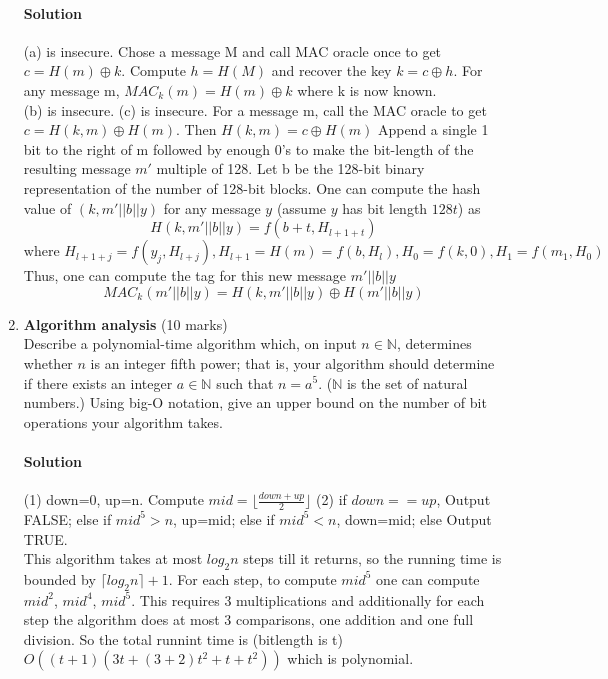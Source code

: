\documentclass[11pt]{article}
\newcommand{\NN}{{\mathbb N}}
\newcommand{\floor}[1]{\lfloor #1 \rfloor}
\begin{document}
\begin{enumerate}
\paragraph{Solution}
(a) is insecure. Chose a message M and call MAC oracle once to get $c=H(m)\oplus k$. Compute $h=H(M)$ and recover the key $k=c\oplus h$. For any message m, $MAC_k(m)=H(m)\oplus k$ where k is now known.\\
(b) is insecure.
(c) is insecure. For a message m, call the MAC oracle to get $c=H(k,m)\oplus H(m)$. Then $H(k,m)=c\oplus H(m)$ Append a single 1 bit to the right of m followed by enough 0's to make the bit-length of the resulting message $m'$ multiple of 128. Let b be the 128-bit binary representation of the number of 128-bit blocks.
One can compute the hash value of $(k,m'||b||y)$ for any message $y$ (assume $y$ has bit length $128t$) as
\[
H(k,m'||b||y)=f(b+t,H_{l+1+t})\] \[ \text{where }H_{l+1+j}=f(y_j,H_{l+j}),
H_{l+1}=H(m)=f(b,H_l), H_0=f(k,0), H_1=f(m_1,H_0)
\]
Thus, one can compute the tag for this new message $m'||b||y$
\[
MAC_k(m'||b||y)=H(k,m'||b||y)\oplus H(m'||b||y)
\]

\newpage
\item {\bf Algorithm analysis} (10 marks) \\
Describe a polynomial-time algorithm which, on input $n \in \NN$,
determines whether $n$ is an integer fifth power; that is, your algorithm
should determine if there exists an integer $a \in \NN$ such that $n
= a^5$.  ($\NN$ is the set of natural numbers.) Using big-O notation,
give an upper bound on the number of bit operations your algorithm takes.
\paragraph{Solution}
(1) down=0, up=n. Compute $mid=\floor{\frac{down+up}{2}}$
(2) if $down == up$, Output FALSE;
    else if $mid^5 > n$, up=mid;
    else if $mid^5 < n$, down=mid;
    else Output TRUE.
    \\
This algorithm takes at most $log_2n$ steps till it returns, so the running time is bounded by $\lceil log_2n \rceil+1$. For each step, to compute $mid^5$ one can compute $mid^2$, $mid^4$, $mid^5$. This requires 3 multiplications and additionally for each step the algorithm does at most 3 comparisons, one addition and one full division. So the total runnint time is (bitlength is t) $O((t+1)(3t+(3+2)t^2+t+t^2))$ which is polynomial.



\end{enumerate}
\end{document}
